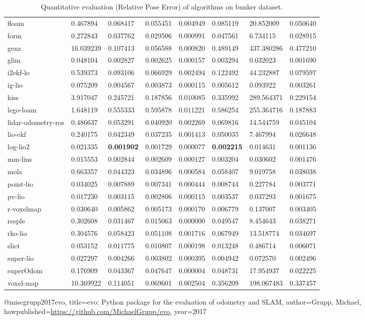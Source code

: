\begin{table}[]
{\begin{tabular}{llllllll}
		floam & 0.467894 & 0.068417 & 0.055451 & 0.004949 & 0.085119 & 20.852009 & 0.050640 \\
		form & 0.272843 & 0.037762 & 0.029506 & 0.000991 & 0.047561 & 6.734115 & 0.028915 \\
		genz & 16.039239 & 0.107413 & 0.056588 & 0.000820 & 0.489149 & 437.380286 & 0.477210 \\
		glim & 0.048104 & 0.002827 & 0.002625 & 0.000157 & 0.003294 & 0.032023 & 0.001690 \\
		i2ekf-lo & 0.539373 & 0.093106 & 0.066929 & 0.002494 & 0.122492 & 44.232887 & 0.079597 \\
		ig-lio & 0.075209 & 0.004567 & 0.003873 & 0.000115 & 0.005612 & 0.093922 & 0.003261 \\
		kiss & 3.917047 & 0.245721 & 0.187856 & 0.010085 & 0.335992 & 289.564371 & 0.229154 \\
		lego-loam & 1.648119 & 0.555333 & 0.595878 & 0.011221 & 0.586254 & 255.364716 & 0.187883 \\
		lidar-odometry-ros & 0.486637 & 0.053291 & 0.040920 & 0.002269 & 0.069816 & 14.544759 & 0.045104 \\
		lio-ekf & 0.240175 & 0.042349 & 0.037235 & 0.001413 & 0.050035 & 7.467994 & 0.026648 \\
		log-lio2 & 0.021335 & \textbf{0.001902} & 0.001729 & 0.000077 & \textbf{0.002215} & 0.014631 & 0.001136 \\
		mm-lins & 0.015553 & 0.002844 & 0.002609 & 0.000127 & 0.003204 & 0.030602 & 0.001476 \\
		mola & 0.663357 & 0.044323 & 0.034896 & 0.000584 & 0.058407 & 9.019758 & 0.038038 \\
		point-lio & 0.034025 & 0.007889 & 0.007341 & 0.000444 & 0.008744 & 0.227784 & 0.003771 \\
		pv-lio & 0.017230 & 0.003115 & 0.002806 & 0.000115 & 0.003537 & 0.037293 & 0.001675 \\
		r-voxelmap & 0.030640 & 0.005862 & 0.005173 & 0.000170 & 0.006779 & 0.137007 & 0.003405 \\
		resple & 0.302608 & 0.031467 & 0.015063 & 0.000000 & 0.049547 & 8.454643 & 0.038271 \\
		rko-lio & 0.304576 & 0.058423 & 0.051108 & 0.001716 & 0.067949 & 13.518774 & 0.034697 \\
		slict & 0.053152 & 0.011775 & 0.010807 & 0.000198 & 0.013248 & 0.486714 & 0.006071 \\
		super-lio & 0.027297 & 0.004266 & 0.003802 & 0.000395 & 0.004942 & 0.072570 & 0.002496 \\
		superOdom & 0.176909 & 0.043367 & 0.047647 & 0.000004 & 0.048731 & 17.954937 & 0.022225 \\
		voxel-map & 10.369922 & 0.114051 & 0.069601 & 0.002504 & 0.356209 & 198.067483 & 0.337457 \\
        	\end{tabular}%
        }
        	\caption{Quantitative evaluation (Relative Pose Error\cite{grupp2017evo}) of algorithms on bunker dataset.}
        	\label{table3}
\end{table}

@misc{grupp2017evo,
  title={evo: Python package for the evaluation of odometry and SLAM},
  author={Grupp, Michael},
  howpublished={\url{https://github.com/MichaelGrupp/evo}},
  year={2017}
}
